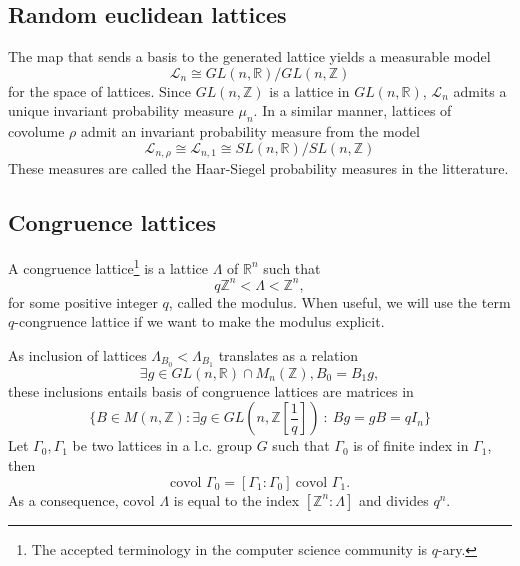 \documentclass{article}
\begin{document}
\subsection{Random euclidean lattices}
The map that sends a basis to the generated lattice yields a measurable model 
\[\mathcal L_n \cong  GL(n,\mathbb R) / GL(n,\mathbb Z) \]
for the space of lattices. Since $GL(n,\mathbb Z)$ is a lattice in $GL(n,\mathbb R)$, $\mathcal L_n$ admits a unique invariant probability measure $\mu_n$. In a similar manner, lattices of covolume $\rho$ admit an invariant probability measure from the model 
\[\mathcal L_{n,\rho} \cong \mathcal L_{n,1}\cong SL(n,\mathbb R) / SL(n,\mathbb Z)\]
These measures are called the Haar-Siegel probability measures in the litterature.


\subsection{Congruence lattices}
A congruence lattice\footnote{The accepted terminology in the computer science community is $q$-ary.} is a lattice $\Lambda$ of $\mathbb R^n$ such that 
\[q\mathbb Z^n < \Lambda < \mathbb Z^n,\]
for some positive integer $q$, called the modulus. When useful, we will use the term $q$-congruence lattice if we want to make the modulus explicit.
 
As inclusion of lattices $\Lambda_{B_0} < \Lambda_{B_1}$ translates as a relation
\[\exists g \in  GL(n,\mathbb R) \cap M_n(\mathbb Z) , B_0 = B_1g , \] 
these inclusions entails basis of congruence lattices are matrices in 
\[\{B\in M(n,\mathbb Z) : \exists g\in GL(n,\mathbb Z[\frac{1}{q}] ) \ : \ Bg = gB = qI_n \}\]
Let $\Gamma_0 , \Gamma_1$ be two lattices in a l.c. group $G$ such that $\Gamma_0$ is of finite index in $\Gamma_1$, then 
\[ \text{covol } \Gamma_0  = [\Gamma_1 : \Gamma_0 ] \ \text{covol } \Gamma_1 .\]
As a consequence, $\text{covol }\Lambda $ is equal to the index $[\mathbb Z^n : \Lambda]$ and divides $q^n$.
\end{document}
